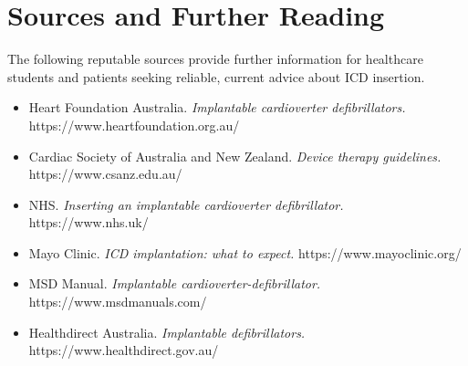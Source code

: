 \section*{Sources and Further Reading}
The following reputable sources provide further information for healthcare students and patients seeking reliable, current advice about ICD insertion.
\begin{itemize}
    \item Heart Foundation Australia. \textit{Implantable cardioverter defibrillators.} https://www.heartfoundation.org.au/
    \item Cardiac Society of Australia and New Zealand. \textit{Device therapy guidelines.} https://www.csanz.edu.au/
    \item NHS. \textit{Inserting an implantable cardioverter defibrillator.} https://www.nhs.uk/
    \item Mayo Clinic. \textit{ICD implantation: what to expect.} https://www.mayoclinic.org/
    \item MSD Manual. \textit{Implantable cardioverter-defibrillator.} https://www.msdmanuals.com/
    \item Healthdirect Australia. \textit{Implantable defibrillators.} https://www.healthdirect.gov.au/
\end{itemize}
